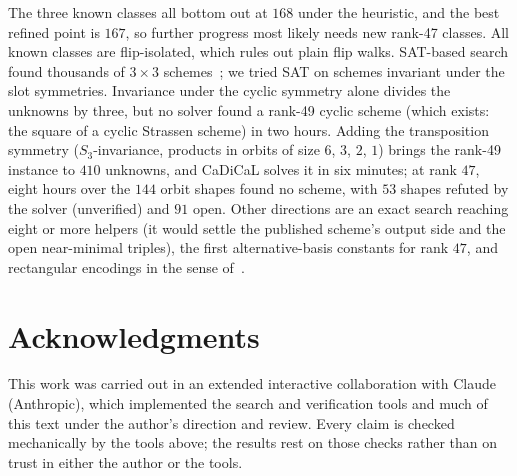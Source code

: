 \documentclass[11pt]{article}
\theoremstyle{remark}
\begin{document}
The three known classes all bottom out at $168$ under the heuristic,
and the best refined point is $167$, so further progress most likely
needs new rank-47 classes.  All known classes are flip-isolated, which
rules out plain flip walks.  SAT-based search found thousands of
$3\times3$ schemes~\cite{HKS19}; we tried SAT on schemes invariant under
the slot symmetries.  Invariance under the cyclic symmetry alone divides
the unknowns by three, but no solver found a rank-49 cyclic scheme
(which exists: the square of a cyclic Strassen scheme) in two hours.
Adding the transposition symmetry ($S_3$-invariance, products in orbits
of size $6$, $3$, $2$, $1$) brings the rank-49 instance to $410$ unknowns,
and CaDiCaL solves it in six minutes; at rank $47$, eight hours over the
$144$ orbit shapes found no scheme, with $53$ shapes refuted by the
solver (unverified) and $91$ open.  Other directions are an exact search
reaching eight or more helpers (it would settle the published scheme's
output side and the open near-minimal triples), the first
alternative-basis constants for rank $47$, and rectangular encodings in
the sense of~\cite{BS19}.

\section*{Acknowledgments}

This work was carried out in an extended interactive collaboration
with Claude (Anthropic), which implemented the search and verification
tools and much of this text under the author's direction and review.
Every claim is checked mechanically by the tools above; the results
rest on those checks rather than on trust in either the author or the
tools.
\end{document}
